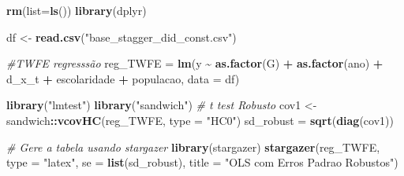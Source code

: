 \documentclass[
]{article}
\author{}
\date{\vspace{-2.5em}}
\newenvironment{Shaded}{\begin{snugshade}}{\end{snugshade}}
\newcommand{\AttributeTok}[1]{\textcolor[rgb]{0.13,0.29,0.53}{#1}}
\newcommand{\CommentTok}[1]{\textcolor[rgb]{0.56,0.35,0.01}{\textit{#1}}}
\newcommand{\FunctionTok}[1]{\textcolor[rgb]{0.13,0.29,0.53}{\textbf{#1}}}
\newcommand{\NormalTok}[1]{#1}
\newcommand{\OtherTok}[1]{\textcolor[rgb]{0.56,0.35,0.01}{#1}}
\newcommand{\SpecialCharTok}[1]{\textcolor[rgb]{0.81,0.36,0.00}{\textbf{#1}}}
\newcommand{\StringTok}[1]{\textcolor[rgb]{0.31,0.60,0.02}{#1}}
\begin{document}
\begin{Shaded}
\begin{Highlighting}[]
\FunctionTok{rm}\NormalTok{(}\AttributeTok{list=}\FunctionTok{ls}\NormalTok{())}
\FunctionTok{library}\NormalTok{(dplyr)}


\NormalTok{df }\OtherTok{\textless{}{-}} \FunctionTok{read.csv}\NormalTok{(}\StringTok{"base\_stagger\_did\_const.csv"}\NormalTok{)}
\end{Highlighting}
\end{Shaded}

\begin{Shaded}
\begin{Highlighting}[]
\CommentTok{\#TWFE regresssão}
\NormalTok{reg\_TWFE }\OtherTok{=} \FunctionTok{lm}\NormalTok{(y }\SpecialCharTok{\textasciitilde{}} \FunctionTok{as.factor}\NormalTok{(G) }\SpecialCharTok{+} \FunctionTok{as.factor}\NormalTok{(ano) }\SpecialCharTok{+}\NormalTok{ d\_x\_t }\SpecialCharTok{+}\NormalTok{ escolaridade }\SpecialCharTok{+}\NormalTok{ populacao, }\AttributeTok{data =}\NormalTok{ df)}

\FunctionTok{library}\NormalTok{(}\StringTok{"lmtest"}\NormalTok{)}
\FunctionTok{library}\NormalTok{(}\StringTok{"sandwich"}\NormalTok{)}
\CommentTok{\# t test Robusto}
\NormalTok{cov1 }\OtherTok{\textless{}{-}}\NormalTok{ sandwich}\SpecialCharTok{::}\FunctionTok{vcovHC}\NormalTok{(reg\_TWFE, }\AttributeTok{type =} \StringTok{"HC0"}\NormalTok{)}
\NormalTok{sd\_robust }\OtherTok{=} \FunctionTok{sqrt}\NormalTok{(}\FunctionTok{diag}\NormalTok{(cov1))}

\CommentTok{\# Gere a tabela usando stargazer}
\FunctionTok{library}\NormalTok{(stargazer)}
\FunctionTok{stargazer}\NormalTok{(reg\_TWFE, }\AttributeTok{type =} \StringTok{"latex"}\NormalTok{, }\AttributeTok{se =} \FunctionTok{list}\NormalTok{(sd\_robust),}
\AttributeTok{title =} \StringTok{"OLS com Erros Padrao Robustos"}\NormalTok{)}
\end{Highlighting}
\end{Shaded}
\end{document}
